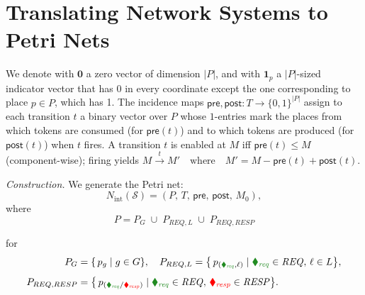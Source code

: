 \clearpage
\section{Translating Network Systems to Petri Nets}
\label{appendix:NS-to-PN-formulation}


We denote with \(\mathbf0\) a zero vector of dimension \(|P|\), and with \(\mathbf1_{p}\) a \(|P|\)-sized indicator vector that has 0 in every coordinate except the one corresponding to place \(p \in P\), which has 1. 
% 
The incidence maps $\mathsf{pre},\mathsf{post}:T\to\{0,1\}^{|P|}$ assign to each transition $t$ a binary vector over $P$ whose $1$-entries mark the places from which tokens are consumed (for $\mathsf{pre}(t)$) and to which tokens are produced (for $\mathsf{post}(t)$) when $t$ fires.
A transition $t$ is enabled at $M$ iff $\mathsf{pre}(t)\le M$ (component-wise); firing yields
\(
M\xrightarrow{t}M' \quad\text{where}\quad M' = M-\mathsf{pre}(t)+\mathsf{post}(t)
\).	

\medskip
\textit{Construction.}
We generate the Petri net:
\[
N_{\mathrm{int}}(\mathcal S)
= (P,\,T,\,\mathsf{pre},\,\mathsf{post},\,M_0),
\]
where
\[
P
=
P_G \;\cup\; P_{REQ,L} \;\cup\; P_{REQ,RESP}
\]

for 
\[
\begin{aligned}
	P_G
	&= \{\,p_g \mid g\in G\},\quad
	P_{REQ,L}
	= \bigl\{\,p_{({\color{ForestGreen}\blacklozenge_{\mathit{req}}},\ell)}
	\mid {\color{ForestGreen}\blacklozenge_{\mathit{req}}}\in\mathit{REQ},\,\ell\in  L\bigr\},\\[1ex]
	P_{REQ,RESP}
	&= \bigl\{\,p_{({\color{ForestGreen}\blacklozenge_{\mathit{req}}}/{\color{red}\blacklozenge_{\mathit{resp}}})}
	\mid {\color{ForestGreen}\blacklozenge_{\mathit{req}}}\in\mathit{REQ},\,
	{\color{red}\blacklozenge_{\mathit{resp}}}\in\mathit{RESP}\bigr\}.
\end{aligned}
\]



